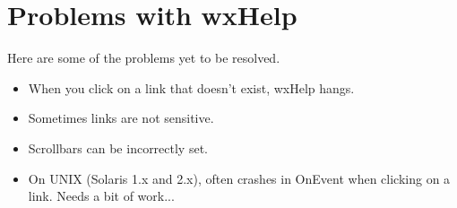 \chapter{Problems with wxHelp}
%
\setfooter{\thepage}{}{}{}{}{\thepage}

Here are some of the problems yet to be resolved.

\begin{itemize}\itemsep=0pt
\item When you click on a link that doesn't exist, wxHelp hangs.
\item Sometimes links are not sensitive.
\item Scrollbars can be incorrectly set.
\item On UNIX (Solaris 1.x and 2.x), often crashes in OnEvent when clicking on
a link. Needs a bit
of work...
\end{itemize}


